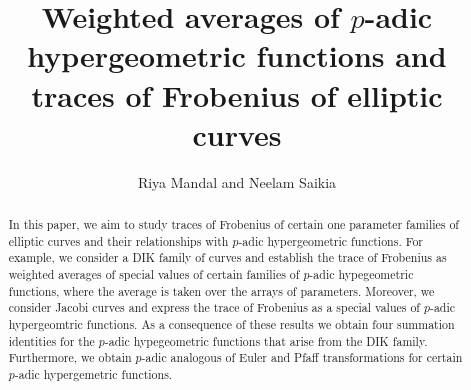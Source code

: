 \documentclass[12pt]{amsart}
\theoremstyle{plain}
\theoremstyle{definition}
\theoremstyle{remark}
\numberwithin{equation}{section}
\begin{document}
	\title[$p$-adic hypergeometric functions and Elliptic curves]{Weighted averages of $p$-adic hypergeometric functions and traces of Frobenius of elliptic curves}
		\author{Riya Mandal and Neelam Saikia}
	

	
	\address{School of Basic Sciences, Indian Institute of Technology Bhubaneswar, Argul, Khordha 752050, Odisha, India.}

	
	\address{School of Basic Sciences, Indian Institute of Technology Bhubaneswar, Argul, Khordha 752050, Odisha, India.}

	
	
	\begin{abstract}
		In this paper, we aim to study traces of Frobenius of certain one parameter families of elliptic curves and their relationships with $p$-adic hypergeometric functions. For example, we consider a DIK family of curves and establish the trace of Frobenius as weighted averages of special values of certain families of $p$-adic hypegeometric functions, where the average is taken over the arrays of parameters. Moreover, we consider Jacobi curves and express the trace of Frobenius as a special values of $p$-adic hypergeomtric functions. As a consequence of these results we obtain four summation identities for the $p$-adic hypegeometric functions that arise from the DIK family. Furthermore, we obtain $p$-adic analogous of Euler and Pfaff transformations for certain $p$-adic hypergemetric functions.
	
         \end{abstract}
	\maketitle
\end{document}
